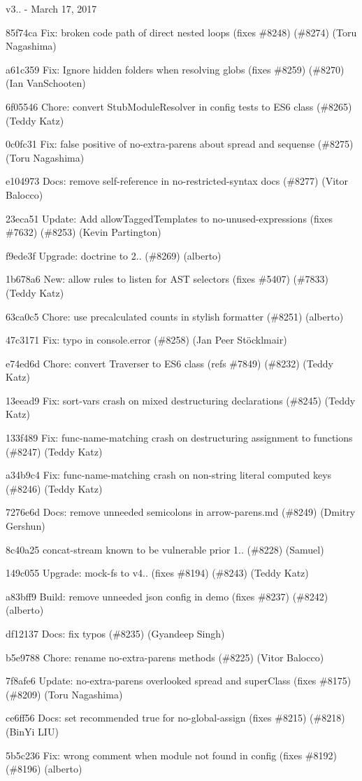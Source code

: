 v3.. -\/ March 17, 2017


\begin{DoxyItemize}
\item 85f74ca Fix\+: broken code path of direct nested loops (fixes \#8248) (\#8274) (Toru Nagashima)
\item a61c359 Fix\+: Ignore hidden folders when resolving globs (fixes \#8259) (\#8270) (Ian Van\+Schooten)
\item 6f05546 Chore\+: convert Stub\+Module\+Resolver in config tests to E\+S6 class (\#8265) (Teddy Katz)
\item 0c0fc31 Fix\+: false positive of no-\/extra-\/parens about spread and sequense (\#8275) (Toru Nagashima)
\item e104973 Docs\+: remove self-\/reference in no-\/restricted-\/syntax docs (\#8277) (Vitor Balocco)
\item 23eca51 Update\+: Add allow\+Tagged\+Templates to no-\/unused-\/expressions (fixes \#7632) (\#8253) (Kevin Partington)
\item f9ede3f Upgrade\+: doctrine to 2.. (\#8269) (alberto)
\item 1b678a6 New\+: allow rules to listen for A\+ST selectors (fixes \#5407) (\#7833) (Teddy Katz)
\item 63ca0c5 Chore\+: use precalculated counts in stylish formatter (\#8251) (alberto)
\item 47c3171 Fix\+: typo in console.\+error (\#8258) (Jan Peer Stöcklmair)
\item e74ed6d Chore\+: convert Traverser to E\+S6 class (refs \#7849) (\#8232) (Teddy Katz)
\item 13eead9 Fix\+: sort-\/vars crash on mixed destructuring declarations (\#8245) (Teddy Katz)
\item 133f489 Fix\+: func-\/name-\/matching crash on destructuring assignment to functions (\#8247) (Teddy Katz)
\item a34b9c4 Fix\+: func-\/name-\/matching crash on non-\/string literal computed keys (\#8246) (Teddy Katz)
\item 7276e6d Docs\+: remove unneeded semicolons in arrow-\/parens.\+md (\#8249) (Dmitry Gershun)
\item 8c40a25 concat-\/stream known to be vulnerable prior 1.. (\#8228) (Samuel)
\item 149c055 Upgrade\+: mock-\/fs to v4.. (fixes \#8194) (\#8243) (Teddy Katz)
\item a83bff9 Build\+: remove unneeded json config in demo (fixes \#8237) (\#8242) (alberto)
\item df12137 Docs\+: fix typos (\#8235) (Gyandeep Singh)
\item b5e9788 Chore\+: rename no-\/extra-\/parens methods (\#8225) (Vitor Balocco)
\item 7f8afe6 Update\+: no-\/extra-\/parens overlooked spread and super\+Class (fixes \#8175) (\#8209) (Toru Nagashima)
\item ce6ff56 Docs\+: set recommended true for no-\/global-\/assign (fixes \#8215) (\#8218) (Bin\+Yi L\+IU)
\item 5b5c236 Fix\+: wrong comment when module not found in config (fixes \#8192) (\#8196) (alberto)
\end{DoxyItemize}

